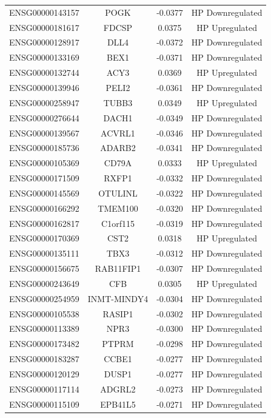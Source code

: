 \documentclass[
]{article}
\begin{document}
\begin{singlespace}
\begin{longtable}[t]{lccc}
\addlinespace
ENSG00000143157 & POGK & -0.0377 & HP Downregulated\\
ENSG00000181617 & FDCSP & 0.0375 & HP Upregulated\\
ENSG00000128917 & DLL4 & -0.0372 & HP Downregulated\\
ENSG00000133169 & BEX1 & -0.0371 & HP Downregulated\\
ENSG00000132744 & ACY3 & 0.0369 & HP Upregulated\\
\addlinespace
ENSG00000139946 & PELI2 & -0.0361 & HP Downregulated\\
ENSG00000258947 & TUBB3 & 0.0349 & HP Upregulated\\
ENSG00000276644 & DACH1 & -0.0349 & HP Downregulated\\
ENSG00000139567 & ACVRL1 & -0.0346 & HP Downregulated\\
ENSG00000185736 & ADARB2 & -0.0341 & HP Downregulated\\
\addlinespace
ENSG00000105369 & CD79A & 0.0333 & HP Upregulated\\
ENSG00000171509 & RXFP1 & -0.0332 & HP Downregulated\\
ENSG00000145569 & OTULINL & -0.0322 & HP Downregulated\\
ENSG00000166292 & TMEM100 & -0.0320 & HP Downregulated\\
ENSG00000162817 & C1orf115 & -0.0319 & HP Downregulated\\
\addlinespace
ENSG00000170369 & CST2 & 0.0318 & HP Upregulated\\
ENSG00000135111 & TBX3 & -0.0312 & HP Downregulated\\
ENSG00000156675 & RAB11FIP1 & -0.0307 & HP Downregulated\\
ENSG00000243649 & CFB & 0.0305 & HP Upregulated\\
ENSG00000254959 & INMT-MINDY4 & -0.0304 & HP Downregulated\\
\addlinespace
ENSG00000105538 & RASIP1 & -0.0302 & HP Downregulated\\
ENSG00000113389 & NPR3 & -0.0300 & HP Downregulated\\
ENSG00000173482 & PTPRM & -0.0298 & HP Downregulated\\
ENSG00000183287 & CCBE1 & -0.0277 & HP Downregulated\\
ENSG00000120129 & DUSP1 & -0.0277 & HP Downregulated\\
\addlinespace
ENSG00000117114 & ADGRL2 & -0.0273 & HP Downregulated\\
ENSG00000115109 & EPB41L5 & -0.0271 & HP Downregulated\\

\end{longtable}
\end{singlespace}
\end{document}
